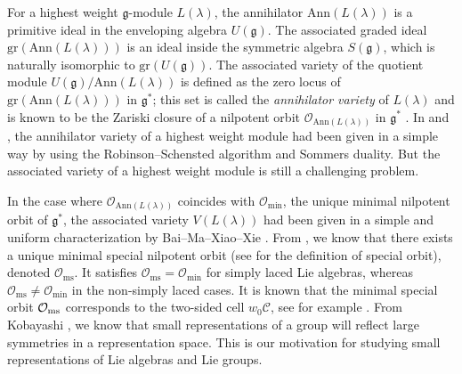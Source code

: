 \documentclass[11pt, reqno]{amsart}
\theoremstyle{definition}
\numberwithin{equation}{section}
\begin{document}
For a highest weight $\mathfrak{g}$-module $L(\lambda)$, the annihilator $\mathrm{Ann}(L(\lambda))$ is a primitive ideal in the enveloping algebra $U(\mathfrak{g})$. The associated graded ideal $\mathrm{gr}(\mathrm{Ann}(L(\lambda)))$ is an ideal inside the symmetric algebra $S(\mathfrak{g})$, which is naturally isomorphic to $\mathrm{gr}(U(\mathfrak{g}))$. The associated variety of  the quotient module $U(\mathfrak{g})/\mathrm{Ann}(L(\lambda))$ is defined as the zero locus of $\mathrm{gr}(\mathrm{Ann}(L(\lambda)))$ in $\mathfrak{g}^*$; this set is called the {\it annihilator variety} of $L(\lambda)$ and is known to be the Zariski closure of a nilpotent orbit $\mathcal{O}_{\mathrm{Ann}(L(\lambda))}$ in $\mathfrak{g}^*$ \cite{Jo85}.  In \cite{BMW} and \cite{BGWX}, the annihilator variety of a highest weight module had been given in a simple way by using the  Robinson--Schensted algorithm and Sommers duality.
But the associated variety of a highest weight module is still a challenging problem. 

In the case where $\mathcal{O}_{\mathrm{Ann}(L(\lambda))}$ coincides with $\mathcal{O}_{\min}$, the unique minimal nilpotent orbit of $\mathfrak{g}^*$, the associated variety $V(L(\lambda))$ had been given in a simple and uniform characterization by Bai--Ma--Xiao--Xie \cite{BMXX}. From  \cite{BMXX}, we know that there exists a unique minimal special nilpotent orbit (see \cite[\S 6.3]{CM} for the definition of special orbit), denoted $\mathcal{O}_{\mathrm{ms}}$. It satisfies $\mathcal{O}_{\mathrm{ms}} = \mathcal{O}_{\min}$ for simply laced Lie algebras, whereas $\mathcal{O}_{\mathrm{ms}} \neq \mathcal{O}_{\min}$ in the non-simply laced cases. It is known that the minimal special orbit $\mathcal{O}_{{\rm ms}}$ corresponds to the two-sided cell $w_0\mathcal{C}$, see for example \cite{BV82,BMXX,BGWX}. From Kobayashi \cite{Ko11}, we know that small representations of a group will reflect large symmetries in a representation space. This is our motivation for studying small representations of Lie algebras and Lie groups.

\end{document}
